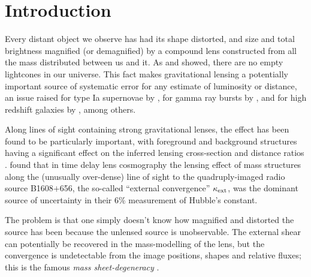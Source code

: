 \documentclass[useAMS,usenatbib]{mn2e}
\begin{document}
\setcounter{footnote}{1}


\section{Introduction}

Every distant object we observe has had its shape distorted, and size
and total brightness magnified (or demagnified) by a compound lens constructed
from all the mass distributed between us and it. As \citet{Vale+White2003} and \citet{HilbertEtal2007}
showed, there are no empty lightcones in our universe. This fact makes gravitational lensing a potentially important source of systematic error for any estimate of luminosity or distance, an issue
raised for \eg type Ia supernovae by \citet[][]{Holz+Wald1998,Linder+Holz2004}, for
gamma ray bursts by \citet[][]{Oguri+Takahashi2006,Wang+Dai2011}, 
and for high redshift galaxies by \citet{BradacEtal2009}, among others. 

Along lines of sight containing strong gravitational lenses,
the effect has been found to be
particularly important, with foreground and background structures
having a significant effect on the inferred lensing cross-section
\citep[\eg][]{WongEtal2012} and distance ratios \citep[][]{DalalEtal2005}.
\citet{SuyuEtal2010} found that in time delay lens cosmography the
lensing effect of mass structures along the (unusually over-dense) line of
sight to the quadruply-imaged radio source B1608$+$656, the so-called ``external
convergence'' $\kappa_{\rm ext}$, was the dominant source of uncertainty in 
their 6\% measurement of Hubble's constant.


The problem is that one simply doesn't know
how magnified and distorted the source has been because the unlensed
source is unobservable. The external shear can potentially be recovered
in the mass-modelling of the lens, but the convergence is undetectable
from the image positions, shapes and relative fluxes; this is the
famous {\emph{  mass sheet-degeneracy}} \citep[see e.g.][for details]{FalcoEtal1985}.
\end{document}
